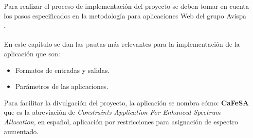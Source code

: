 Para realizar el proceso de implementación del proyecto se deben tomar en cuenta los pasos especificados en la metodología para aplicaciones Web del grupo Avispa \cite{Metodologia}.
\\\\
En este capítulo se dan las pautas más relevantes para la implementación de la aplicación que son:

\begin{itemize}
	\item Formatos de entradas y salidas.
	\item Parámetros de las aplicaciones.
\end{itemize}

Para facilitar la divulgación del proyecto, la aplicación se nombra cómo: \textbf{CaFeSA} que es la abreviación de \textit{Constraints Application For Enhanced Spectrum Allocation}, en español, aplicación por restricciones para asignación de espectro aumentado.
